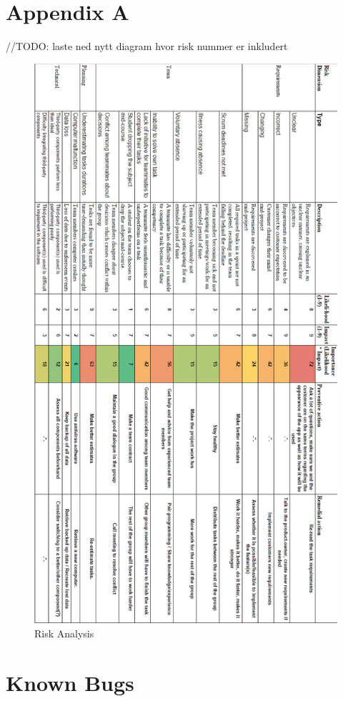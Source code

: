 \appendix
\chapter{Appendix A}


//TODO: laste ned nytt diagram hvor risk nummer er inkludert

\begin{figure}[h!]
\centering
\includegraphics[scale=0.6]{Figures/RiskMatrix.png}
\caption{Risk Analysis}
\label{fig:RiskFull}
\end{figure}

\chapter{Known Bugs}